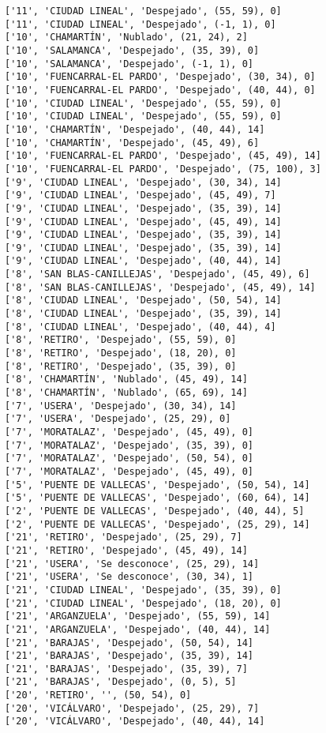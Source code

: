 \documentclass[11pt]{article}
\begin{document}
\begin{Verbatim}[commandchars=\\\{\}]
['11', 'CIUDAD LINEAL', 'Despejado', (55, 59), 0]
['11', 'CIUDAD LINEAL', 'Despejado', (-1, 1), 0]
['10', 'CHAMARTÍN', 'Nublado', (21, 24), 2]
['10', 'SALAMANCA', 'Despejado', (35, 39), 0]
['10', 'SALAMANCA', 'Despejado', (-1, 1), 0]
['10', 'FUENCARRAL-EL PARDO', 'Despejado', (30, 34), 0]
['10', 'FUENCARRAL-EL PARDO', 'Despejado', (40, 44), 0]
['10', 'CIUDAD LINEAL', 'Despejado', (55, 59), 0]
['10', 'CIUDAD LINEAL', 'Despejado', (55, 59), 0]
['10', 'CHAMARTÍN', 'Despejado', (40, 44), 14]
['10', 'CHAMARTÍN', 'Despejado', (45, 49), 6]
['10', 'FUENCARRAL-EL PARDO', 'Despejado', (45, 49), 14]
['10', 'FUENCARRAL-EL PARDO', 'Despejado', (75, 100), 3]
['9', 'CIUDAD LINEAL', 'Despejado', (30, 34), 14]
['9', 'CIUDAD LINEAL', 'Despejado', (45, 49), 7]
['9', 'CIUDAD LINEAL', 'Despejado', (35, 39), 14]
['9', 'CIUDAD LINEAL', 'Despejado', (45, 49), 14]
['9', 'CIUDAD LINEAL', 'Despejado', (35, 39), 14]
['9', 'CIUDAD LINEAL', 'Despejado', (35, 39), 14]
['9', 'CIUDAD LINEAL', 'Despejado', (40, 44), 14]
['8', 'SAN BLAS-CANILLEJAS', 'Despejado', (45, 49), 6]
['8', 'SAN BLAS-CANILLEJAS', 'Despejado', (45, 49), 14]
['8', 'CIUDAD LINEAL', 'Despejado', (50, 54), 14]
['8', 'CIUDAD LINEAL', 'Despejado', (35, 39), 14]
['8', 'CIUDAD LINEAL', 'Despejado', (40, 44), 4]
['8', 'RETIRO', 'Despejado', (55, 59), 0]
['8', 'RETIRO', 'Despejado', (18, 20), 0]
['8', 'RETIRO', 'Despejado', (35, 39), 0]
['8', 'CHAMARTÍN', 'Nublado', (45, 49), 14]
['8', 'CHAMARTÍN', 'Nublado', (65, 69), 14]
['7', 'USERA', 'Despejado', (30, 34), 14]
['7', 'USERA', 'Despejado', (25, 29), 0]
['7', 'MORATALAZ', 'Despejado', (45, 49), 0]
['7', 'MORATALAZ', 'Despejado', (35, 39), 0]
['7', 'MORATALAZ', 'Despejado', (50, 54), 0]
['7', 'MORATALAZ', 'Despejado', (45, 49), 0]
['5', 'PUENTE DE VALLECAS', 'Despejado', (50, 54), 14]
['5', 'PUENTE DE VALLECAS', 'Despejado', (60, 64), 14]
['2', 'PUENTE DE VALLECAS', 'Despejado', (40, 44), 5]
['2', 'PUENTE DE VALLECAS', 'Despejado', (25, 29), 14]
['21', 'RETIRO', 'Despejado', (25, 29), 7]
['21', 'RETIRO', 'Despejado', (45, 49), 14]
['21', 'USERA', 'Se desconoce', (25, 29), 14]
['21', 'USERA', 'Se desconoce', (30, 34), 1]
['21', 'CIUDAD LINEAL', 'Despejado', (35, 39), 0]
['21', 'CIUDAD LINEAL', 'Despejado', (18, 20), 0]
['21', 'ARGANZUELA', 'Despejado', (55, 59), 14]
['21', 'ARGANZUELA', 'Despejado', (40, 44), 14]
['21', 'BARAJAS', 'Despejado', (50, 54), 14]
['21', 'BARAJAS', 'Despejado', (35, 39), 14]
['21', 'BARAJAS', 'Despejado', (35, 39), 7]
['21', 'BARAJAS', 'Despejado', (0, 5), 5]
['20', 'RETIRO', '', (50, 54), 0]
['20', 'VICÁLVARO', 'Despejado', (25, 29), 7]
['20', 'VICÁLVARO', 'Despejado', (40, 44), 14]

\end{Verbatim}
\end{document}
